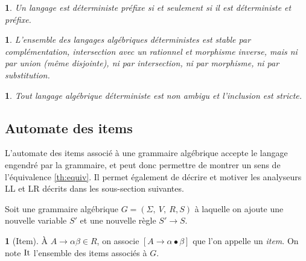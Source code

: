 \documentclass[10pt,a4paper,notitlepage]{article}
\theoremstyle{plain}
\theoremstyle{definition}
\newtheorem{defn}[thm]{\protect\definitionname}
\theoremstyle{definition}
\theoremstyle{remark}
\theoremstyle{remark}
\theoremstyle{plain}
\theoremstyle{plain}
\newtheorem{prop}[thm]{\protect\propositionname}
\theoremstyle{plain}
\theoremstyle{remark}
\providecommand{\definitionname}{Définition}
\providecommand{\propositionname}{Proposition}
\begin{document}
\begin{prop} %
	Un langage est déterministe préfixe si et seulement si il est déterministe et préfixe.
\end{prop}

\begin{prop}
	L'ensemble des langages algébriques déterministes est stable par complémentation, intersection avec un rationnel et morphisme inverse, mais ni par union (même disjointe), ni par intersection, ni par morphisme, ni par substitution.
\end{prop}

\begin{prop} %
	Tout langage algébrique déterministe est non ambigu et l'inclusion est stricte.
\end{prop}

\subsection{Automate des items}

L'automate des items associé à une grammaire algébrique accepte le langage engendré par la grammaire, et peut donc permettre de montrer un sens de l'équivalence \ref{th:equiv}. Il permet également de décrire et motiver les analyseurs LL et LR décrits dans les sous-section suivantes.

Soit une grammaire algébrique $G=\left(\Sigma,\ V,\ R, S\right)$ à
laquelle on ajoute une nouvelle variable $S'$ et une nouvelle règle
$S'\to S$.

\begin{defn}[Item]
À $A\to\alpha\beta\in R$, on associe $\left[A\to\alpha\bullet\beta\right]$
que l'on appelle un \emph{item}. On note $\operatorname{It}$ l'ensemble des items associés
à $G$.
\end{defn}
\end{document}
